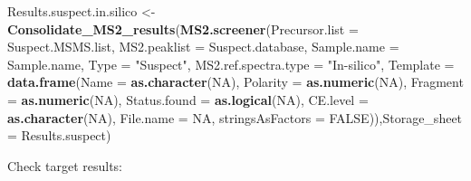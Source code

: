 \documentclass[]{article}
\newenvironment{Shaded}{\begin{snugshade}}{\end{snugshade}}
\newcommand{\KeywordTok}[1]{\textcolor[rgb]{0.13,0.29,0.53}{\textbf{#1}}}
\newcommand{\DataTypeTok}[1]{\textcolor[rgb]{0.13,0.29,0.53}{#1}}
\newcommand{\StringTok}[1]{\textcolor[rgb]{0.31,0.60,0.02}{#1}}
\newcommand{\OtherTok}[1]{\textcolor[rgb]{0.56,0.35,0.01}{#1}}
\newcommand{\OperatorTok}[1]{\textcolor[rgb]{0.81,0.36,0.00}{\textbf{#1}}}
\newcommand{\NormalTok}[1]{#1}
\begin{document}
\begin{Shaded}
\begin{Highlighting}[]
\NormalTok{Results.suspect.in.silico <-}\StringTok{ }\KeywordTok{Consolidate_MS2_results}\NormalTok{(}\KeywordTok{MS2.screener}\NormalTok{(}\DataTypeTok{Precursor.list =}\NormalTok{  Suspect.MSMS.list,}
                                                        \DataTypeTok{MS2.peaklist =}\NormalTok{ Suspect.database,}
                                                        \DataTypeTok{Sample.name =}\NormalTok{ Sample.name,}
                                                        \DataTypeTok{Type =} \StringTok{"Suspect"}\NormalTok{,}
                                                        \DataTypeTok{MS2.ref.spectra.type =} \StringTok{"In-silico"}\NormalTok{,}
                                                        \DataTypeTok{Template =} \KeywordTok{data.frame}\NormalTok{(}\DataTypeTok{Name =} \KeywordTok{as.character}\NormalTok{(}\OtherTok{NA}\NormalTok{),}
                                                                              \DataTypeTok{Polarity =} \KeywordTok{as.numeric}\NormalTok{(}\OtherTok{NA}\NormalTok{),}
                                                                              \DataTypeTok{Fragment =} \KeywordTok{as.numeric}\NormalTok{(}\OtherTok{NA}\NormalTok{),}
                                                                              \DataTypeTok{Status.found =} \KeywordTok{as.logical}\NormalTok{(}\OtherTok{NA}\NormalTok{),}
                                                                              \DataTypeTok{CE.level =} \KeywordTok{as.character}\NormalTok{(}\OtherTok{NA}\NormalTok{),                         }
                                                                              \DataTypeTok{File.name =} \OtherTok{NA}\NormalTok{, }\DataTypeTok{stringsAsFactors =} \OtherTok{FALSE}\NormalTok{)),}\DataTypeTok{Storage_sheet =}\NormalTok{ Results.suspect)}
\end{Highlighting}
\end{Shaded}

Check target results:

\begin{Shaded}
\end{Shaded}
\end{document}
